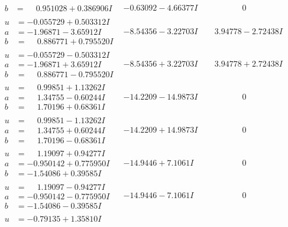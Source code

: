 \documentclass[1p]{elsarticle_modified}
\theoremstyle{definition}
\begin{document}
$$\begin{array}{c|c|c}
\begin{aligned}
b &= \phantom{-}0.951028 + 0.386906 I\end{aligned}
 & -0.63092 - 4.66377 I & \phantom{-0.000000 } 0 \\ \hline\begin{aligned}
u &= -0.055729 + 0.503312 I \\
a &= -1.96871 - 3.65912 I \\
b &= \phantom{-}0.886771 + 0.795520 I\end{aligned}
 & -8.54356 - 3.22703 I & \phantom{-}3.94778 - 2.72438 I \\ \hline\begin{aligned}
u &= -0.055729 - 0.503312 I \\
a &= -1.96871 + 3.65912 I \\
b &= \phantom{-}0.886771 - 0.795520 I\end{aligned}
 & -8.54356 + 3.22703 I & \phantom{-}3.94778 + 2.72438 I \\ \hline\begin{aligned}
u &= \phantom{-}0.99851 + 1.13262 I \\
a &= \phantom{-}1.34755 - 0.60244 I \\
b &= \phantom{-}1.70196 + 0.68361 I\end{aligned}
 & -14.2209 - 14.9873 I & \phantom{-0.000000 } 0 \\ \hline\begin{aligned}
u &= \phantom{-}0.99851 - 1.13262 I \\
a &= \phantom{-}1.34755 + 0.60244 I \\
b &= \phantom{-}1.70196 - 0.68361 I\end{aligned}
 & -14.2209 + 14.9873 I & \phantom{-0.000000 } 0 \\ \hline\begin{aligned}
u &= \phantom{-}1.19097 + 0.94277 I \\
a &= -0.950142 + 0.775950 I \\
b &= -1.54086 + 0.39585 I\end{aligned}
 & -14.9446 + 7.1061 I & \phantom{-0.000000 } 0 \\ \hline\begin{aligned}
u &= \phantom{-}1.19097 - 0.94277 I \\
a &= -0.950142 - 0.775950 I \\
b &= -1.54086 - 0.39585 I\end{aligned}
 & -14.9446 - 7.1061 I & \phantom{-0.000000 } 0 \\ \hline\begin{aligned}
u &= -0.79135 + 1.35810 I \\

\end{aligned}
\end{array}$$
\end{document}
